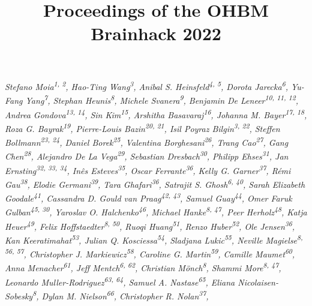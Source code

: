 \documentclass[10pt,a4paper,twocolumns]{proc}
\title{Proceedings of the OHBM Brainhack 2022}
\newcommand{\authors}[1]{\emph{\footnotesize #1} \\}
\begin{document}
\maketitle

\authors{Stefano Moia\textsuperscript{1, 2}, %
Hao-Ting Wang\textsuperscript{3}, %
Anibal S. Heinsfeld\textsuperscript{4, 5}, %
Dorota Jarecka\textsuperscript{6}, %
Yu-Fang Yang\textsuperscript{7}, %
Stephan Heunis\textsuperscript{8}, %
Michele Svanera\textsuperscript{9}, %
Benjamin De Leneer\textsuperscript{10, 11, 12}, %
Andrea Gondova\textsuperscript{13, 14}, %
Sin Kim\textsuperscript{15}, %
Arshitha Basavaraj\textsuperscript{16}, %
Johanna M. Bayer\textsuperscript{17, 18}, %
Roza G. Bayrak\textsuperscript{19}, %
Pierre-Louis Bazin\textsuperscript{20, 21}, %
Isil Poyraz Bilgin\textsuperscript{3, 22}, %
Steffen Bollmann\textsuperscript{23, 24}, %
Daniel Borek\textsuperscript{25}, %
Valentina Borghesani\textsuperscript{26}, %
Trang Cao\textsuperscript{27}, %
Gang Chen\textsuperscript{28}, %
Alejandro De La Vega\textsuperscript{29}, %
Sebastian Dresbach\textsuperscript{30}, %
Philipp Ehses\textsuperscript{31}, %
Jan Ernsting\textsuperscript{32, 33, 34}, %
Inês Esteves\textsuperscript{35}, %
Oscar Ferrante\textsuperscript{36}, %
Kelly G. Garner\textsuperscript{37}, %
Rémi Gau\textsuperscript{38}, %
Elodie Germani\textsuperscript{39}, %
Tara Ghafari\textsuperscript{36}, %
Satrajit S. Ghosh\textsuperscript{6, 40}, %
Sarah Elizabeth Goodale\textsuperscript{41}, %
Cassandra D. Gould van Praag\textsuperscript{42, 43}, %
Samuel Guay\textsuperscript{44}, %
Omer Faruk Gulban\textsuperscript{45, 30}, %
Yaroslav O. Halchenko\textsuperscript{46}, %
Michael Hanke\textsuperscript{8, 47}, %
Peer Herholz\textsuperscript{48}, %
Katja Heuer\textsuperscript{49}, %
Felix Hoffstaedter\textsuperscript{8, 50}, %
Ruoqi Huang\textsuperscript{51}, %
Renzo Huber\textsuperscript{52}, %
Ole Jensen\textsuperscript{36}, %
Kan Keeratimahat\textsuperscript{53}, %
Julian Q. Kosciessa\textsuperscript{54}, %
Sladjana Lukic\textsuperscript{55}, %
Neville Magielse\textsuperscript{8, 56, 57}, %
Christopher J. Markiewicz\textsuperscript{58}, %
Caroline G. Martin\textsuperscript{59}, %
Camille Maumet\textsuperscript{60}, %
Anna Menacher\textsuperscript{61}, %
Jeff Mentch\textsuperscript{6, 62}, %
Christian Mönch\textsuperscript{8}, %
Shammi More\textsuperscript{8, 47}, %
Leonardo Muller-Rodriguez\textsuperscript{63, 64}, %
Samuel A. Nastase\textsuperscript{65}, %
Eliana Nicolaisen-Sobesky\textsuperscript{8}, %
Dylan M. Nielson\textsuperscript{66}, %
Christopher R. Nolan\textsuperscript{37}, %
}
\end{document}
